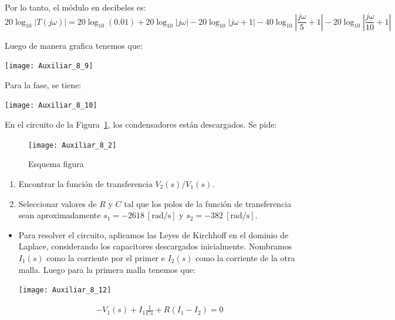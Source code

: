 \documentclass[
  11pt,
  letterpaper,
   addpoints,
   answers
  ]{exam}
\begin{document}
\begin{questions}
\begin{solution}
Por lo tanto, el módulo en decibeles es:
\[
20\log_{10} \left| T(j\omega) \right| = 20\log_{10}(0.01) + 20\log_{10}|j\omega| - 20\log_{10}|j\omega + 1| - 40\log_{10} \left| \frac{j\omega}{5} + 1 \right| - 20\log_{10} \left| \frac{j\omega}{10} + 1 \right|
\]

Luego de manera grafica tenemos que:
\begin{center}
    \texttt{[image: Auxiliar\_8\_9]}
\end{center}
Para la fase, se tiene:
\begin{center}
    \texttt{[image: Auxiliar\_8\_10]}
\end{center}


\end{solution}

\question En el circuito de la Figura~\ref{fig:esquema-filtro}, los condensadores están descargados. Se pide:

\begin{figure}[h!]
    \centering
    \texttt{[image: Auxiliar\_8\_2]}
    \caption{Esquema figura}
    \label{fig:esquema-filtro}
\end{figure}

\begin{enumerate}
    \item Encontrar la función de transferencia \( V_2(s)/V_1(s) \).
    \item Seleccionar valores de \( R \) y \( C \) tal que los polos de la función de transferencia sean aproximadamente \( s_1 = -2618~[\text{rad/s}] \) y \( s_2 = -382~[\text{rad/s}] \).
\end{enumerate}
\begin{solution}
    \begin{itemize}
        \item  Para resolver el circuito, aplicamos las Leyes de Kirchhoff en el dominio de Laplace, considerando los capacitores descargados inicialmente. Nombramos \( I_1(s) \) como la corriente por el primer e \( I_2(s) \) como la corriente de la otra malla. Luego para la primera malla tenemos que:
\begin{center}
    \texttt{[image: Auxiliar\_8\_12]}
\end{center}
\begin{align}
    -V_1(s) + I_1 \frac{1}{Cs} + R(I_1 - I_2) = 0
\end{align}


\end{itemize}
\end{solution}
\end{questions}
\end{document}
